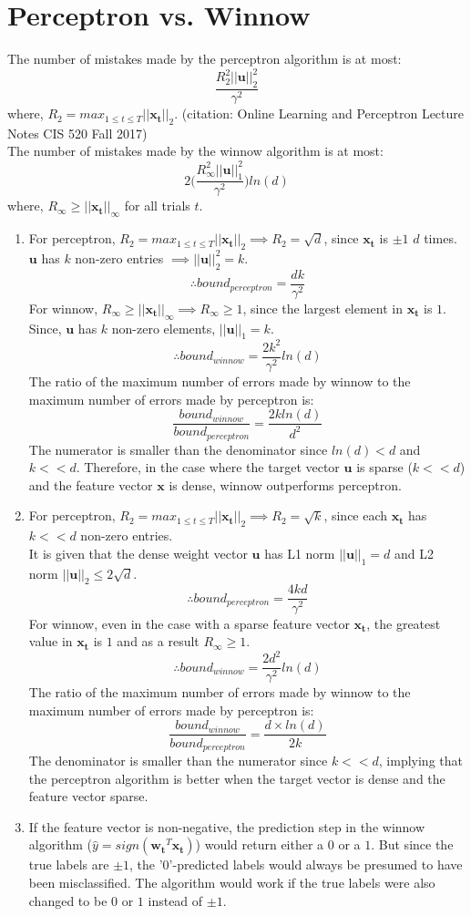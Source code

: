 \documentclass[english]{article}
\begin{document}
\section{Perceptron vs. Winnow}
The number of mistakes made by the perceptron algorithm is at most:
$$\frac{R_2^2 ||\mathbf{u}||_2^2}{\gamma^2}$$
where, $R_2 = max_{1\leq t\leq T} ||\mathbf{x_t}||_2$. (citation: Online Learning and Perceptron Lecture Notes CIS 520 Fall 2017) \\
The number of mistakes made by the winnow algorithm is at most:
$$2\bigg(\frac{R_\infty^2 ||\mathbf{u}||_1^2}{\gamma^2}\bigg) ln(d)$$
where, $R_\infty \geq ||\mathbf{x_t}||_\infty$ for all trials $t$. 
\begin{enumerate}
    \item For perceptron, $R_2 = max_{1\leq t\leq T} ||\mathbf{x_t}||_2 \implies R_2 = \sqrt d$, since $\mathbf{x_t}$ is $\pm1$ $d$ times. $\mathbf{u}$ has $k$ non-zero entries $\implies ||\mathbf{u}||_2^2 = k$.  
    $$\therefore bound_{perceptron} = \frac{dk}{\gamma^2}$$
    For winnow, $R_\infty \geq ||\mathbf{x_t}||_\infty \implies R_\infty \geq 1$, since the largest element in $\mathbf{x_t}$ is $1$. Since, $\mathbf{u}$ has $k$ non-zero elements,  $||\mathbf{u}||_1 = k$.
    $$\therefore bound_{winnow} = \frac{2k^2}{\gamma^2}ln(d)$$
    The ratio of the maximum number of errors made by winnow to the maximum number of errors made by perceptron is:
    $$\frac{bound_{winnow}}{bound_{perceptron}} = \frac{2kln(d)}{d^2}$$
    The numerator is smaller than the denominator since $ln(d) < d$ and $k << d$. Therefore, in the case where the target vector $\mathbf{u}$ is sparse ($k << d$) and the feature vector $\mathbf{x}$ is dense, winnow outperforms perceptron. 
    \item For perceptron, $R_2 = max_{1\leq t\leq T} ||\mathbf{x_t}||_2 \implies R_2 = \sqrt k$, since each $\mathbf{x_t}$ has $k << d$ non-zero entries. \\
    It is given that the dense weight vector $\mathbf{u}$ has L1 norm $||\mathbf{u}||_1 = d$ and L2 norm $||\mathbf{u}||_2 \leq 2\sqrt d$. 
    $$\therefore bound_{perceptron} = \frac{4kd}{\gamma^2}$$
    For winnow, even in the case with a sparse feature vector $\mathbf{x_t}$, the greatest value in $\mathbf{x_t}$ is $1$ and as a result $R_\infty \geq 1$. 
    $$\therefore bound_{winnow} = \frac{2d^2}{\gamma^2}ln(d)$$
    The ratio of the maximum number of errors made by winnow to the maximum number of errors made by perceptron is:
    $$\frac{bound_{winnow}}{bound_{perceptron}} = \frac{d \times ln(d)}{2k}$$
    The denominator is smaller than the numerator since $k << d$, implying that the perceptron algorithm is better when the target vector is dense and the feature vector sparse. 
    \item If the feature vector is non-negative, the prediction step in the winnow algorithm ($\hat{y} = sign(\mathbf{w_t}^T \mathbf{x_t})$) would return either a $0$ or a $1$. But since the true labels are $\pm1$, the '$0$'-predicted labels would always be presumed to have been misclassified. The algorithm would work if the true labels were also changed to be $0$ or $1$ instead of $\pm1$. 
\end{enumerate}
\end{document}
